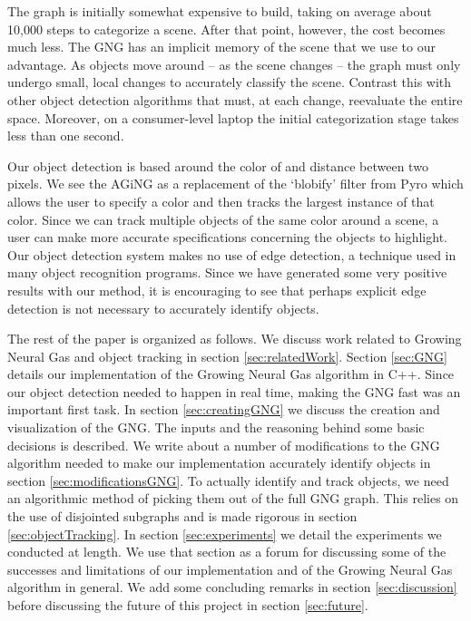 \documentclass{article}
\renewcommand{\|}{\origbar} %
\begin{document}
The graph is initially somewhat expensive to build, taking on average about 10,000 steps to categorize a scene. After that point, however, the cost becomes much less. The GNG has an implicit memory of the scene that we use to our advantage. As objects move around -- as the scene changes -- the graph must only undergo small, local changes to accurately classify the scene. Contrast this with other object detection algorithms that must, at each change, reevaluate the entire space. Moreover, on a consumer-level laptop the initial categorization stage takes less than one second. 

Our object detection is based around the color of and distance between two pixels. We see the AGiNG as a replacement of the `blobify' filter from Pyro which allows the user to specify a color and then tracks the largest instance of that color. Since we can track multiple objects of the same color around a scene, a user can make more accurate specifications concerning the objects to highlight. Our object detection system makes no use of edge detection, a technique used in many object recognition programs. Since we have generated some very positive results with our method, it is encouraging to see that perhaps explicit edge detection is not necessary to accurately identify objects.

The rest of the paper is organized as follows. We discuss work related to Growing Neural Gas and object tracking in section \ref{sec:relatedWork}. Section \ref{sec:GNG} details our implementation of the Growing Neural Gas algorithm in C++. Since our object detection needed to happen in real time, making the GNG fast was an important first task. In section \ref{sec:creatingGNG} we discuss the creation and visualization of the GNG. The inputs and the reasoning behind some basic decisions is described. We write about a number of modifications to the GNG algorithm needed to make our implementation accurately identify objects in section \ref{sec:modificationsGNG}. To actually identify and track objects, we need an algorithmic method of picking them out of the full GNG graph. This relies on the use of disjointed subgraphs and is made rigorous in section \ref{sec:objectTracking}. In section \ref{sec:experiments} we detail the experiments we conducted at length. We use that section as a forum for discussing some of the successes and limitations of our implementation and of the Growing Neural Gas algorithm in general. We add some concluding remarks in section \ref{sec:discussion} before discussing the future of this project in section \ref{sec:future}.
\end{document}
